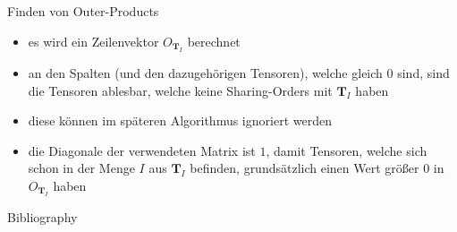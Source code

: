 \documentclass{beamer}
\begin{document}
			\begin{frame}{Finden von Outer-Products}
				\begin{itemize}
					\item es wird ein Zeilenvektor $O_{\bm{T}_I}$ berechnet
					\item an den Spalten (und den dazugehörigen Tensoren), welche gleich $0$ sind, sind die Tensoren ablesbar, welche keine Sharing-Orders mit $\bm{T}_I$ haben
					\item diese können im späteren Algorithmus ignoriert werden \pause
					\item die Diagonale der verwendeten Matrix ist $1$, damit Tensoren, welche sich schon in der Menge $I$ aus $\bm{T}_I$ befinden, grundsätzlich einen Wert größer $0$ in $O_{\bm{T}_I}$ haben
				\end{itemize}
			\end{frame}
	
	
	
	\begin{frame}[allowframebreaks]{Bibliography}
		
		
	\end{frame}
	
\end{document}
